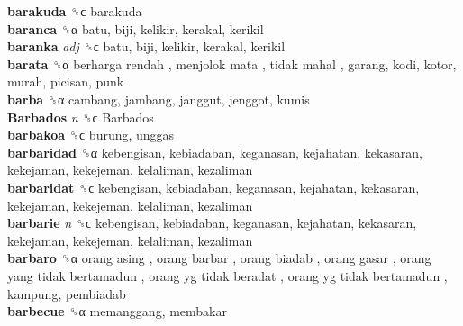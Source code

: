 \textbf{barakuda} ␝ϲ  barakuda  \\
\textbf{baranca} ␝α  batu, biji, kelikir, kerakal, kerikil  \\
\textbf{baranka} \emph{adj}  ␝ϲ  batu, biji, kelikir, kerakal, kerikil  \\
\textbf{barata} ␝α   berharga rendah ,  menjolok mata ,  tidak mahal , garang, kodi, kotor, murah, picisan, punk  \\
\textbf{barba} ␝α  cambang, jambang, janggut, jenggot, kumis  \\
\textbf{Barbados} \emph{n}  ␝ϲ   Barbados   \\
\textbf{barbakoa} ␝ϲ  burung, unggas  \\
\textbf{barbaridad} ␝α  kebengisan, kebiadaban, keganasan, kejahatan, kekasaran, kekejaman, kekejeman, kelaliman, kezaliman  \\
\textbf{barbaridat} ␝ϲ  kebengisan, kebiadaban, keganasan, kejahatan, kekasaran, kekejaman, kekejeman, kelaliman, kezaliman  \\
\textbf{barbarie} \emph{n}  ␝ϲ  kebengisan, kebiadaban, keganasan, kejahatan, kekasaran, kekejaman, kekejeman, kelaliman, kezaliman  \\
\textbf{barbaro} ␝α   orang asing ,  orang barbar ,  orang biadab ,  orang gasar ,  orang yang tidak bertamadun ,  orang yg tidak beradat ,  orang yg tidak bertamadun , kampung, pembiadab  \\
\textbf{barbecue} ␝α  memanggang, membakar  \\
